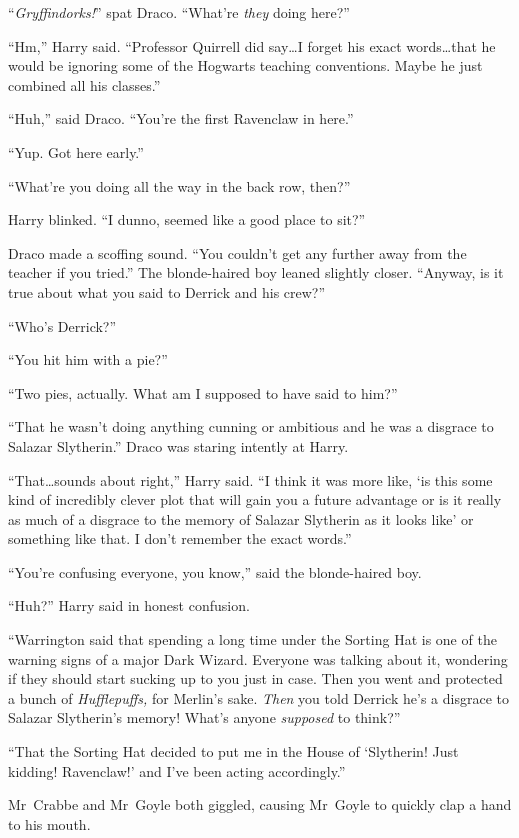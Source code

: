 “\emph{Gryffindorks!}” spat Draco. “What’re \emph{they} doing here?”

“Hm,” Harry said. “Professor Quirrell did say…I forget his exact words…that he would be ignoring some of the Hogwarts teaching conventions. Maybe he just combined all his classes.”

“Huh,” said Draco. “You’re the first Ravenclaw in here.”

“Yup. Got here early.”

“What’re you doing all the way in the back row, then?”

Harry blinked. “I dunno, seemed like a good place to sit?”

Draco made a scoffing sound. “You couldn’t get any further away from the teacher if you tried.” The blonde-haired boy leaned slightly closer. “Anyway, is it true about what you said to Derrick and his crew?”

“Who’s Derrick?”

“You hit him with a pie?”

“Two pies, actually. What am I supposed to have said to him?”

“That he wasn’t doing anything cunning or ambitious and he was a disgrace to Salazar Slytherin.” Draco was staring intently at Harry.

“That…sounds about right,” Harry said. “I think it was more like, ‘is this some kind of incredibly clever plot that will gain you a future advantage or is it really as much of a disgrace to the memory of Salazar Slytherin as it looks like’ or something like that. I don’t remember the exact words.”

“You’re confusing everyone, you know,” said the blonde-haired boy.

“Huh?” Harry said in honest confusion.

“Warrington said that spending a long time under the Sorting Hat is one of the warning signs of a major Dark Wizard. Everyone was talking about it, wondering if they should start sucking up to you just in case. Then you went and protected a bunch of \emph{Hufflepuffs,} for Merlin’s sake. \emph{Then} you told Derrick he’s a disgrace to Salazar Slytherin’s memory! What’s anyone \emph{supposed} to think?”

“That the Sorting Hat decided to put me in the House of ‘Slytherin! Just kidding! Ravenclaw!’ and I’ve been acting accordingly.”

Mr~Crabbe and Mr~Goyle both giggled, causing Mr~Goyle to quickly clap a hand to his mouth.

